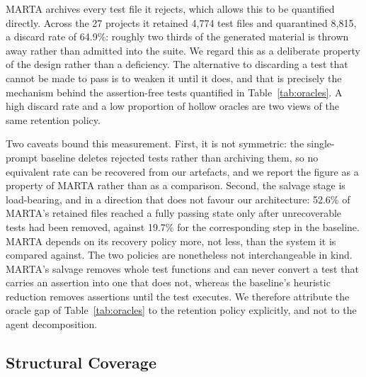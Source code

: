MARTA archives every test file it rejects, which allows this to be quantified
directly. Across the 27 projects it retained 4{,}774 test files and quarantined
8{,}815, a discard rate of 64.9\%: roughly two thirds of the generated material is
thrown away rather than admitted into the suite. We regard this as a deliberate
property of the design rather than a deficiency. The alternative to discarding a test
that cannot be made to pass is to weaken it until it does, and that is precisely the
mechanism behind the assertion-free tests quantified in Table~\ref{tab:oracles}. A
high discard rate and a low proportion of hollow oracles are two views of the same
retention policy.

Two caveats bound this measurement. First, it is not symmetric: the single-prompt
baseline deletes rejected tests rather than archiving them, so no equivalent rate can
be recovered from our artefacts, and we report the figure as a property of MARTA
rather than as a comparison. Second, the salvage stage is load-bearing, and in a
direction that does not favour our architecture: 52.6\% of MARTA's retained files
reached a fully passing state only after unrecoverable tests had been removed,
against 19.7\% for the corresponding step in the baseline. MARTA depends on its
recovery policy more, not less, than the system it is compared against. The two
policies are nonetheless not interchangeable in kind. MARTA's salvage removes whole
test functions and can never convert a test that carries an assertion into one that
does not, whereas the baseline's heuristic reduction removes assertions until the
test executes. We therefore attribute the oracle gap of
Table~\ref{tab:oracles} to the retention policy explicitly, and not to the agent
decomposition.


\subsection{Structural Coverage}
\label{sec:coverage}

